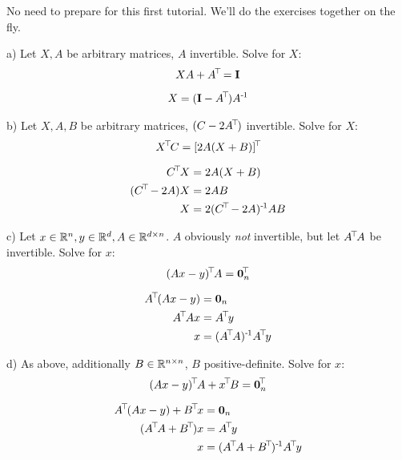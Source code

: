 

\renewcommand{\course}{Robotics}
\renewcommand{\coursepicture}{roboticsLecture}
\renewcommand{\coursedate}{Winter 2014}
\renewcommand{\exnum}{1}

\exercises

No need to prepare for this first tutorial. We'll do the exercises together on the fly.


a) Let $X,A$ be arbitrary matrices, $A$ invertible. Solve for $X$:
$$ X A + A^{\!\top\!} = {\rm\bf I} $$

\begin{solution}
\begin{align}
 X = ({\rm\bf I} - A^{\!\top\!})A^{{\hspace*{-.0pt}\text{\rm -}\hspace*{-.5pt}}1}
\end{align}
\end{solution}

b) Let $X,A,B$ be arbitrary matrices, $(C-2A^{\!\top\!})$ invertible. Solve for $X$:
$$ X^{\!\top\!} C = [2 A (X + B)]^{\!\top\!} $$

\begin{solution}
\begin{align}
 C^{\!\top\!} X &= 2 A (X + B) \\
 (C^{\!\top\!}-2A) X &= 2 A B \\
 X &= 2 (C^{\!\top\!}-2A)^{{\hspace*{-.0pt}\text{\rm -}\hspace*{-.5pt}}1} A B  
\end{align}
\end{solution}

c) Let $x\in{\mathbb{R}}^n,y\in{\mathbb{R}}^d,A\in{\mathbb{R}}^{d\times n}$. $A$ obviously \emph{not}
invertible, but let $A^{\!\top\!} A$ be invertible. Solve for $x$:
$$ (A x - y)^{\!\top\!} A = \boldsymbol 0_n^{\!\top\!} $$

\begin{solution}
\begin{align}
A^\T (A x - y) &= \vec 0_n \\
A^\T A x  &= A^\T y \\
x  &= (A^\T A)^\1 A^\T y
\end{align}
\end{solution}

d) As above, additionally $B\in{\mathbb{R}}^{n\times n}$, $B$
positive-definite. Solve for $x$: 
$$ (A x - y)^{\!\top\!} A + x^{\!\top\!} B = \boldsymbol 0_n^{\!\top\!} $$

\begin{solution}
\begin{align}
A^\T (A x - y) + B^\T x &= \vec 0_n \\
(A^\T A + B^\T) x  &= A^\T y \\
x  &= (A^\T A + B^\T)^\1 A^\T y
\end{align}
\end{solution}

